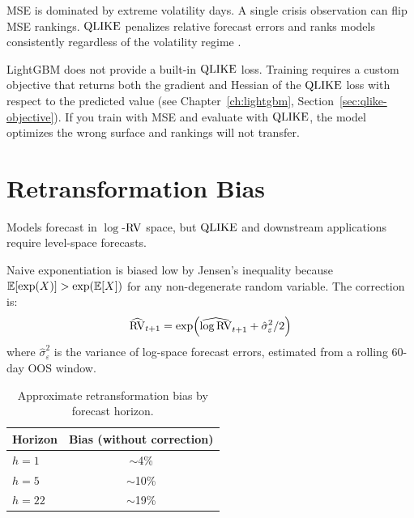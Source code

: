 
\begin{warning}
MSE is dominated by extreme volatility days.
A single crisis observation can flip MSE rankings.
$\operatorname{QLIKE}$ penalizes relative forecast errors and ranks models consistently regardless of the volatility regime \citep{Patton2011}.

LightGBM does not provide a built-in $\operatorname{QLIKE}$ loss.
Training requires a custom objective that returns both the gradient and Hessian of the $\operatorname{QLIKE}$ loss with respect to the predicted value (see Chapter~\ref{ch:lightgbm}, Section~\ref{sec:qlike-objective}).
If you train with MSE and evaluate with $\operatorname{QLIKE}$, the model optimizes the wrong surface and rankings will not transfer.
\end{warning}


\section{Retransformation Bias}
\label{sec:retransformation}

Models forecast in $\log$-$\operatorname{RV}$ space, but $\operatorname{QLIKE}$ and downstream applications require level-space forecasts.

Naive exponentiation is biased low by Jensen's inequality because $\mathbb{E}[\exp(X)] > \exp(\mathbb{E}[X])$ for any non-degenerate random variable.
The correction is:
\begin{equation}
\label{eq:retransformation}
\widehat{\operatorname{RV}}_{t+1} = \exp\!\left(\widehat{\log \operatorname{RV}}_{t+1} + \hat{\sigma}^2_\varepsilon / 2\right)
\end{equation}
where $\hat{\sigma}^2_\varepsilon$ is the variance of log-space forecast errors, estimated from a rolling 60-day OOS window.

\begin{table}[htbp]
\centering
\caption{Approximate retransformation bias by forecast horizon.}
\label{tab:retrans-bias}
\small
\begin{tabular}{@{}lc@{}}
\toprule
\textbf{Horizon} & \textbf{Bias (without correction)} \\
\midrule
$h = 1$  & $\sim$4\%  \\
$h = 5$  & $\sim$10\% \\
$h = 22$ & $\sim$19\% \\
\bottomrule
\end{tabular}
\end{table}

